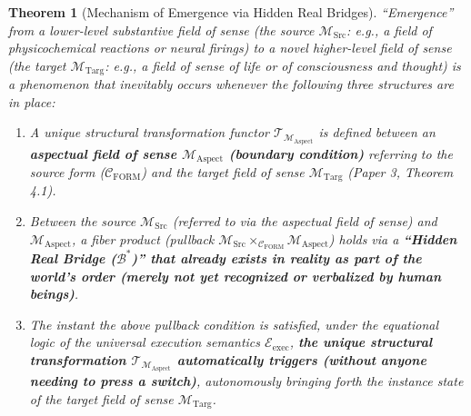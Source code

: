\documentclass[11pt,a4paper]{article}
\theoremstyle{definition}
\theoremstyle{plain}
\newtheorem{theorem}{Theorem}[section]
\begin{document}
\begin{theorem}[Mechanism of Emergence via Hidden Real Bridges]
``Emergence'' from a lower-level substantive field of sense (the source $\mathcal{M}_{\mathrm{Src}}$: e.g., a field of physicochemical reactions or neural firings) to a novel higher-level field of sense (the target $\mathcal{M}_{\mathrm{Targ}}$: e.g., a field of sense of life or of consciousness and thought) is a phenomenon that inevitably occurs whenever the following three structures are in place:
\begin{enumerate}
    \item A unique structural transformation functor $\mathcal{T}_{\mathcal{M}_{\mathrm{Aspect}}}$ is defined between an \textbf{aspectual field of sense $\mathcal{M}_{\mathrm{Aspect}}$ (boundary condition)} referring to the source form ($\mathcal{C}_{\mathrm{FORM}}$) and the target field of sense $\mathcal{M}_{\mathrm{Targ}}$ (Paper 3, Theorem 4.1).
    \item Between the source $\mathcal{M}_{\mathrm{Src}}$ (referred to via the aspectual field of sense) and $\mathcal{M}_{\mathrm{Aspect}}$, a fiber product (pullback $\mathcal{M}_{\mathrm{Src}} \times_{\mathcal{C}_{\mathrm{FORM}}} \mathcal{M}_{\mathrm{Aspect}}$) holds via a \textbf{``Hidden Real Bridge ($\mathcal{B}^*$)'' that already exists in reality as part of the world's order (merely not yet recognized or verbalized by human beings)}.
    \item The instant the above pullback condition is satisfied, under the equational logic of the universal execution semantics $\mathcal{E}_{\mathrm{exec}}$, \textbf{the unique structural transformation $\mathcal{T}_{\mathcal{M}_{\mathrm{Aspect}}}$ automatically triggers (without anyone needing to press a switch)}, autonomously bringing forth the instance state of the target field of sense $\mathcal{M}_{\mathrm{Targ}}$.
\end{enumerate}
\end{theorem}
\end{document}
